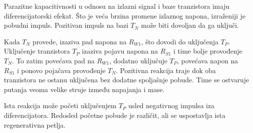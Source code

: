 Parazitne kapacitivnosti u odnosu na izlazni signal i baze tranzistora imaju diferencijatorski efekat. Što je veća brzina promene izlaznog napona, izraženiji je pobudni impuls. Pozitivan impuls na bazi $T_N$ može biti dovoljan da ga uključi.

Kada $T_N$ provede, izaziva pad napona na $R_{W1}$, što dovodi do uključenja $T_P$. Uključenje tranzistora $T_P$ izaziva pojavu napona na $R_{S1}$ i time bolje provođenje $T_N$. To zatim povećava pad na $R_{W1}$, dodatno uključuje $T_P$, povećava napon na $R_{S1}$ i ponovo pojačava provođenje $T_N$. Pozitivna reakcija traje dok oba tranzistora ne ostanu uključena bez dodatne spoljašnje pobude. Time se ostvaruje putanja veoma velike struje između napajanja i mase.

Ista reakcija može početi uključenjem $T_P$ usled negativnog impulsa iza diferencijatora. Redosled početne pobude je različit, ali se uspostavlja ista regenerativna petlja.
